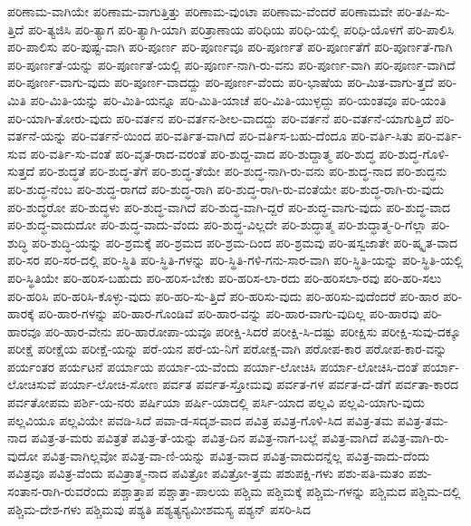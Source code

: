 {ಪರಿಣಾಮ-ವಾಗಿಯೇ
ಪರಿಣಾಮ-ವಾಗುತ್ತಿತ್ತು
ಪರಿಣಾಮ-ವುಂಟಾ
ಪರಿಣಾಮ-ವೆಂದರೆ
ಪರಿಣಾಮವೇ
ಪರಿ-ತಪಿ-ಸು-ತ್ತಿದೆ
ಪರಿ-ತ್ಯಜಿಸಿ
ಪರಿ-ತ್ಯಾಗ
ಪರಿ-ತ್ಯಾಗಿ-ಯಾಗಿ
ಪರಿತ್ರಾಣಾಯ
ಪರಿಧಿಯ
ಪರಿಧಿ-ಯಲ್ಲಿ
ಪರಿಧಿ-ಯೊಳಗೆ
ಪರಿ-ಪಾಲಿಸಿ
ಪರಿ-ಪಾಲಿಸು
ಪರಿ-ಪುಷ್ಟ-ವಾಗಿ
ಪರಿ-ಪೂರ್ಣ
ಪರಿ-ಪೂರ್ಣವೂ
ಪರಿ-ಪೂರ್ಣತೆ
ಪರಿ-ಪೂರ್ಣತೆಗೆ
ಪರಿ-ಪೂರ್ಣತೆ-ಗಾಗಿ
ಪರಿ-ಪೂರ್ಣತೆ-ಯನ್ನು
ಪರಿ-ಪೂರ್ಣತೆ-ಯಲ್ಲಿ
ಪರಿ-ಪೂರ್ಣ-ನಾಗಿ-ರು-ವನು
ಪರಿ-ಪೂರ್ಣ-ವಾಗಿ
ಪರಿ-ಪೂರ್ಣ-ವಾಗಿದೆ
ಪರಿ-ಪೂರ್ಣ-ವಾಗು-ವುದು
ಪರಿ-ಪೂರ್ಣ-ವಾದದ್ದು
ಪರಿ-ಪೂರ್ಣ-ವೆಂದು
ಪರಿ-ಭಾಷೆಯ
ಪರಿ-ಮಿತ-ವಾಗು-ತ್ತದೆ
ಪರಿ-ಮಿತಿ
ಪರಿ-ಮಿತಿ-ಯನ್ನು
ಪರಿ-ಮಿತಿ-ಯನ್ನೂ
ಪರಿ-ಮಿತಿ-ಯಾಚೆ
ಪರಿ-ಮಿತಿ-ಯುಳ್ಳದ್ದು
ಪರಿ-ಯಂತವೂ
ಪರಿ-ಯಂತಿ
ಪರಿ-ಯಾಗಿ-ತೋರು-ವುದು
ಪರಿ-ವರ್ತನ
ಪರಿ-ವರ್ತನ-ಶೀಲ-ವಾದದ್ದು
ಪರಿ-ವರ್ತನೆ
ಪರಿ-ವರ್ತನೆ-ಯಾಗುತ್ತಿದೆ
ಪರಿ-ವರ್ತನೆ-ಯನ್ನು
ಪರಿ-ವರ್ತನೆ-ಯಿಂದ
ಪರಿ-ವರ್ತಿತ-ವಾಗಿದೆ
ಪರಿ-ವರ್ತಿಸ-ಬಹು-ದೆಂದೂ
ಪರಿ-ವರ್ತಿ-ಸಿತು
ಪರಿ-ವರ್ತಿ-ಸುವ
ಪರಿ-ವರ್ತಿ-ಸು-ವಂತೆ
ಪರಿ-ವೃತ-ರಾದ-ವರಂತೆ
ಪರಿ-ಶುದ್ದ-ವಾದ
ಪರಿ-ಶುದ್ದಾತ್ಮ
ಪರಿ-ಶುದ್ಧ
ಪರಿ-ಶುದ್ಧ-ಗೊಳಿ-ಸುತ್ತದೆ
ಪರಿ-ಶುದ್ಧತೆ
ಪರಿ-ಶುದ್ಧ-ತೆಗೆ
ಪರಿ-ಶುದ್ಧ-ತೆಯೇ
ಪರಿ-ಶುದ್ಧ-ನಾಗಿ-ರು-ವನು
ಪರಿ-ಶುದ್ಧ-ನಾದ
ಪರಿ-ಶುದ್ಧನು
ಪರಿ-ಶುದ್ಧ-ನೆಂಬ
ಪರಿ-ಶುದ್ಧ-ರಾಗದೆ
ಪರಿ-ಶುದ್ಧ-ರಾಗಿ
ಪರಿ-ಶುದ್ಧ-ರಾಗಿ-ರು-ವಂತೆಯೇ
ಪರಿ-ಶುದ್ಧ-ರಾಗಿ-ರು-ವುದು
ಪರಿ-ಶುದ್ಧರೋ
ಪರಿ-ಶುದ್ಧಳು
ಪರಿ-ಶುದ್ಧ-ವಾಗಿದೆ
ಪರಿ-ಶುದ್ಧ-ವಾಗಿ-ದ್ದರೆ
ಪರಿ-ಶುದ್ಧ-ವಾಗು-ವುದು
ಪರಿ-ಶುದ್ಧ-ವಾದ
ಪರಿ-ಶುದ್ಧ-ವಾದುದೋ
ಪರಿ-ಶುದ್ಧ-ವಾದು-ವೆಂದು
ಪರಿ-ಶುದ್ಧ-ವಿಲ್ಲದೇ
ಪರಿ-ಶುದ್ಧಾತ್ಮ
ಪರಿ-ಶುದ್ಧಾತ್ಮ-ರಿ-ಗೆಲ್ಲಾ
ಪರಿ-ಶುದ್ಧಿ
ಪರಿ-ಶುದ್ಧಿ-ಯನ್ನು
ಪರಿ-ಶ್ರಮಕ್ಕೆ
ಪರಿ-ಶ್ರಮದ
ಪರಿ-ಶ್ರಮ-ದಿಂದ
ಪರಿ-ಶ್ರಮವು
ಪರಿ-ಷಸ್ವಜಾತೇ
ಪರಿ-ಷ್ಕೃತ-ವಾದ
ಪರಿ-ಸರ
ಪರಿ-ಸರ-ದಲ್ಲಿ
ಪರಿ-ಸ್ಥಿತಿ
ಪರಿ-ಸ್ಥಿತಿ-ಗಳನ್ನು
ಪರಿ-ಸ್ಥಿತಿ-ಗಳಿ-ಗನು-ಸಾರ-ವಾಗಿ
ಪರಿ-ಸ್ಥಿತಿ-ಯನ್ನು
ಪರಿ-ಸ್ಥಿತಿ-ಯಲ್ಲಿ
ಪರಿ-ಸ್ಥಿತಿಯೇ
ಪರಿ-ಹರಿಸ-ಬಹುದು
ಪರಿ-ಹರಿಸ-ಬೇಕು
ಪರಿ-ಹರಿಸ-ಲಾ-ರದು
ಪರಿ-ಹರಿಸಲಾ-ರವು
ಪರಿ-ಹರಿ-ಸಲು
ಪರಿ-ಹರಿಸಿ
ಪರಿ-ಹರಿಸಿ-ಕೊಳ್ಳು-ವುದು
ಪರಿ-ಹರಿ-ಸು-ತ್ತಿದೆ
ಪರಿ-ಹರಿಸು-ವುದು
ಪರಿ-ಹರಿಸು-ವುದೆಂದರೆ
ಪರಿ-ಹಾರ
ಪರಿ-ಹಾರಕ್ಕೆ
ಪರಿ-ಹಾರ-ಗಳನ್ನು
ಪರಿ-ಹಾರ-ಗೊಂಡಿವೆ
ಪರಿ-ಹಾರ-ವನ್ನು
ಪರಿ-ಹಾರ-ವಾಗು-ವುದಿಲ್ಲ
ಪರಿ-ಹಾರವು
ಪರಿ-ಹಾರವೂ
ಪರಿ-ಹಾರ-ವೇನು
ಪರಿ-ಹಾರೋಪಾ-ಯವೂ
ಪರೀಕ್ಷಿ-ಸಿದರೆ
ಪರೀಕ್ಷಿ-ಸಿ-ದಷ್ಟು
ಪರೀಕ್ಷಿಸು
ಪರೀಕ್ಷಿ-ಸುವು-ದಕ್ಕೂ
ಪರೀಕ್ಷೆ
ಪರೀಕ್ಷೆಯ
ಪರೀಕ್ಷೆ-ಯನ್ನು
ಪರೆ-ಯನ
ಪರೆ-ಯ-ನಿಗೆ
ಪರೋಕ್ಷ-ವಾಗಿ
ಪರೋಪ-ಕಾರ
ಪರೋಪ-ಕಾರ-ವನ್ನು
ಪರ್ಯಂತರ
ಪರ್ಯಟನೆ
ಪರ್ಯಾಯ
ಪರ್ಯಾ-ಯ-ವೆಂದು
ಪರ್ಯಾ-ಲೋಚಿಸಿ
ಪರ್ಯಾ-ಲೋಚಿಸಿ-ದಂತೆ
ಪರ್ಯಾ-ಲೋಚಿಸುವೆ
ಪರ್ಯಾ-ಲೋಚಿ-ಸೋಣ
ಪರ್ವತ
ಪರ್ವತ-ಸ್ತೋಮವು
ಪರ್ವತ-ಗಳ
ಪರ್ವತ-ದೆ-ಡೆಗೆ
ಪರ್ವತಾ-ಕಾರದ
ಪರ್ವತೋಪಮ
ಪರ್ಶಿ-ಯ-ನರು
ಪರ್ಷಿಯಾ
ಪರ್ಷಿ-ಯಾದಲ್ಲಿ
ಪರ್ಸಿ-ಯಾದ
ಪಲ್ಲವಿ
ಪಲ್ಲವಿ-ಯಾಗು-ವುದು
ಪಲ್ಲವಿಯೂ
ಪಲ್ಲವಿಯೇ
ಪವಡಿ-ಸಿದೆ
ಪವಾ-ಡ-ಸದೃಶ-ವಾದ
ಪವಿತ್ರ
ಪವಿತ್ರ-ಗೊಳಿ-ಸಿದ
ಪವಿತ್ರ-ತಮ
ಪವಿತ್ರ-ತಮ-ನಾದ
ಪವಿತ್ರ-ತ-ಮರು
ಪವಿತ್ರತೆ
ಪವಿತ್ರ-ತೆ-ಯನ್ನು
ಪವಿತ್ರ-ದಿನ
ಪವಿತ್ರ-ನಾಗ-ಬಲ್ಲೆ
ಪವಿತ್ರ-ವಾಗಿದೆ
ಪವಿತ್ರ-ವಾಗಿ-ರು-ವುದೋ
ಪವಿತ್ರ-ವಾಗಿಲ್ಲವೋ
ಪವಿತ್ರ-ವಾ-ಣಿ-ಯನ್ನು
ಪವಿತ್ರ-ವಾದ
ಪವಿತ್ರ-ವಾದುದನ್ನೆಲ್ಲ
ಪವಿತ್ರ-ವಾದು-ದೆಂದು
ಪವಿತ್ರವೂ
ಪವಿತ್ರ-ವೆಂದು
ಪವಿತ್ರಾತ್ಮ-ನಾದ
ಪವಿತ್ರೋ
ಪವಿತ್ರೋ-ತ್ತಮ
ಪಶುಪಕ್ಷಿ-ಗಳು
ಪಶು-ಪತಿ-ಮತಂ
ಪಶು-ಸಂತಾನ-ರಾಗಿ-ರುವರೆಂದು
ಪಶ್ಚಾತ್ತಾಪ
ಪಶ್ಚಾತ್ತಾ-ಪಾಲಯ
ಪಶ್ಚಿಮ
ಪಶ್ಚಿಮಕ್ಕೆ
ಪಶ್ಚಿಮ-ಗಳನ್ನು
ಪಶ್ಚಿಮದ
ಪಶ್ಚಿಮ-ದಲ್ಲಿ
ಪಶ್ಚಿಮ-ದೇಶ-ಗಳು
ಪಶ್ಚಿಮವು
ಪಶ್ಯತಿ
ಪಶ್ಯತ್ಯನ್ಯಮೀಶಮಸ್ಯ
ಪಶ್ಯನ್
ಪಸರಿ-ಸಿದ
}
